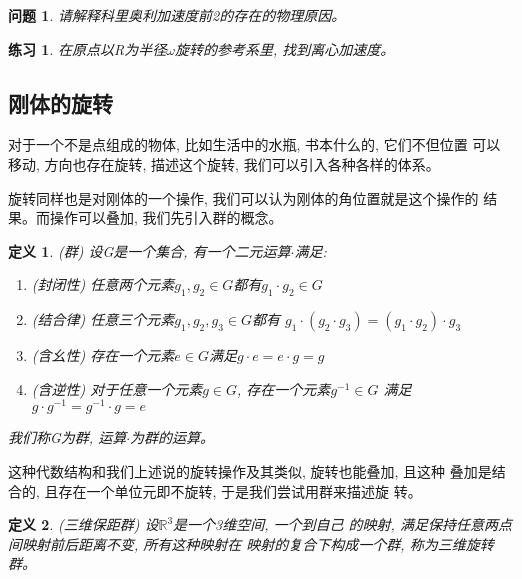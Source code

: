 \documentclass{ctexart}
\numberwithin{equation}{subsection}
\numberwithin{theorem}{subsection}
\newtheorem{definition} {定义}
\numberwithin{definition}{subsection}
\numberwithin{proof}{subsection}
\numberwithin{lemma}{subsection}
\numberwithin{example}{subsection}
\numberwithin{remark}{subsection}
\numberwithin{corollary}{subsection}
\newtheorem{exercise}   {练习}
\numberwithin{exercise}{subsection}
\newtheorem{problem}    {问题}
\numberwithin{problem}{subsection}
\numberwithin{question}{section}
\numberwithin{method}{subsection}
\begin{document}
    \begin{problem}
        \label{1.2 eq:problem 2 before Coriolis acceleration}
        请解释科里奥利加速度前2的存在的物理原因。
    \end{problem}
    \begin{exercise}
        \label{1.2 eq:exercise the rotating O}
        在原点以R为半径\(\omega\)旋转的参考系里, 找到离心加速度。
    \end{exercise}

    \subsection{刚体的旋转}

    对于一个不是点组成的物体, 比如生活中的水瓶, 书本什么的, 它们不但位置
    可以移动, 方向也存在旋转, 描述这个旋转, 我们可以引入各种各样的体系。

    旋转同样也是对刚体的一个操作, 我们可以认为刚体的角位置就是这个操作的
    结果。而操作可以叠加, 我们先引入群的概念。

    \begin{definition}
        \label{1.3 math:group}
        (群) 设G是一个集合, 有一个二元运算\(\cdot\)满足:
        \begin{enumerate}
            \item (封闭性) 任意两个元素\(g_1, g_2 \in G\)都有\(g_1 \cdot g_2 \in G\)
            \item (结合律) 任意三个元素\(g_1, g_2, g_3 \in G\)都有
                \(g_1 \cdot (g_2 \cdot g_3) = (g_1 \cdot g_2) \cdot g_3\)
            \item (含幺性) 存在一个元素\(e \in G\)满足\(g \cdot e = e \cdot g = g\)
            \item (含逆性) 对于任意一个元素\(g \in G\), 存在一个元素\(g^{-1} \in G\)
                满足\(g \cdot g^{-1} = g^{-1} \cdot g = e\)
        \end{enumerate}
        我们称G为群, 运算\(\cdot\)为群的运算。
    \end{definition}

    这种代数结构和我们上述说的旋转操作及其类似, 旋转也能叠加, 且这种
    叠加是结合的, 且存在一个单位元即不旋转, 于是我们尝试用群来描述旋
    转。

    \begin{definition}
        \label{1.3 eq:3D Trotation group}
        (三维保距群) 设\(\mathbb{R}^3\)是一个3维空间, 一个到自己
        的映射, 满足保持任意两点间映射前后距离不变, 所有这种映射在
        映射的复合下构成一个群, 称为三维旋转群。
    \end{definition}
\end{document}
